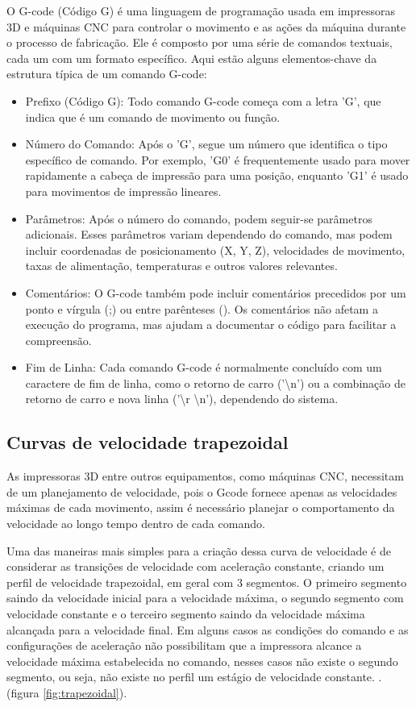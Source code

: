 O G-code (Código G) é uma linguagem de programação usada em impressoras 3D e máquinas CNC para controlar o movimento e as ações da máquina durante o processo de fabricação. Ele é composto por uma série de comandos textuais, cada um com um formato específico. Aqui estão alguns elementos-chave da estrutura típica de um comando G-code:

\begin{itemize}
    \item Prefixo (Código G): Todo comando G-code começa com a letra 'G', que indica que é um comando de movimento ou função.
    \item Número do Comando: Após o 'G', segue um número que identifica o tipo específico de comando. Por exemplo, 'G0' é frequentemente usado para mover rapidamente a cabeça de impressão para uma posição, enquanto 'G1' é usado para movimentos de impressão lineares.
    \item Parâmetros: Após o número do comando, podem seguir-se parâmetros adicionais. Esses parâmetros variam dependendo do comando, mas podem incluir coordenadas de posicionamento (X, Y, Z), velocidades de movimento, taxas de alimentação, temperaturas e outros valores relevantes.
    \item Comentários: O G-code também pode incluir comentários precedidos por um ponto e vírgula (;) ou entre parênteses (). Os comentários não afetam a execução do programa, mas ajudam a documentar o código para facilitar a compreensão.
    \item Fim de Linha: Cada comando G-code é normalmente concluído com um caractere de fim de linha, como o retorno de carro ('\textbackslash n') ou a combinação de retorno de carro e nova linha ('\textbackslash r \textbackslash n'), dependendo do sistema.
\end{itemize}

\subsection{Curvas de velocidade trapezoidal}
As impressoras 3D entre outros equipamentos, como máquinas CNC, necessitam
de um planejamento de velocidade, pois o Gcode fornece apenas as velocidades máximas
de cada movimento, assim é necessário planejar o comportamento da velocidade ao longo tempo
dentro de cada comando.

Uma das maneiras mais simples para a criação dessa curva de velocidade é
de considerar as transições de velocidade com aceleração constante, criando 
um perfil de velocidade trapezoidal, em geral com 3 segmentos.
O primeiro segmento saindo da velocidade inicial para a velocidade máxima,
o segundo segmento com velocidade constante e o terceiro segmento saindo da velocidade máxima alcançada
para a velocidade final.
Em alguns casos as condições do comando e as configurações de aceleração não possibilitam que a impressora
alcance a velocidade máxima estabelecida no comando, nesses casos não existe o segundo segmento, ou seja, não existe
no perfil um estágio de velocidade constante.
\cite{yu20,klipperkinematic}.
(figura \ref{fig:trapezoidal}).

